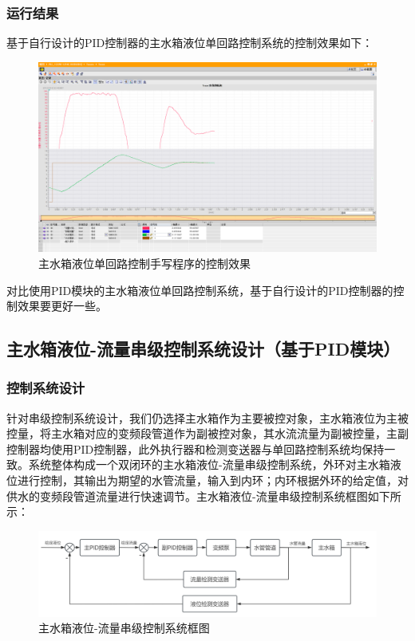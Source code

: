 \documentclass[UTF8]{article}
\begin{document}
\subsubsection{运行结果}
基于自行设计的PID控制器的主水箱液位单回路控制系统的控制效果如下：
\begin{figure}[H]
    \centering %
    \includegraphics[width=1\textwidth]{figure/单回路控制效果.png} 
    \caption{主水箱液位单回路控制手写程序的控制效果} %
\end{figure}

对比使用PID模块的主水箱液位单回路控制系统，基于自行设计的PID控制器的控制效果要更好一些。

\subsection{主水箱液位-流量串级控制系统设计（基于PID模块）}
\subsubsection{控制系统设计}
针对串级控制系统设计，我们仍选择主水箱作为主要被控对象，主水箱液位为主被控量，将主水箱对应的变频段管道作为副被控对象，其水流流量为副被控量，主副控制器均使用PID控制器，此外执行器和检测变送器与单回路控制系统均保持一致。系统整体构成一个双闭环的主水箱液位-流量串级控制系统，外环对主水箱液位进行控制，其输出为期望的水管流量，输入到内环；内环根据外环的给定值，对供水的变频段管道流量进行快速调节。主水箱液位-流量串级控制系统框图如下所示：
\begin{figure}[H]
    \centering %
    \includegraphics[width=1\textwidth]{figure/主水箱液位-流量串级控制系统框图.png} 
    \caption{主水箱液位-流量串级控制系统框图} %
\end{figure}
\end{document}
